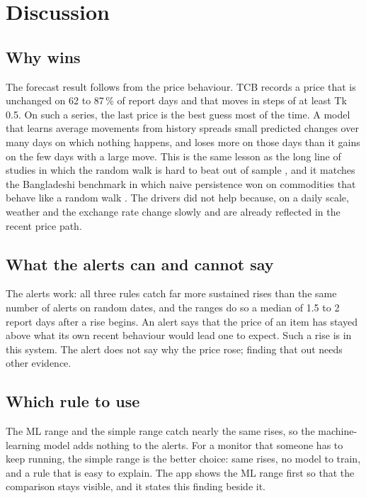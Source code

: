 \section{Discussion}

\subsection{Why \naive{} wins}
The forecast result follows from the price behaviour. TCB records a price that is unchanged on 62 to 87\,\% of report days and that moves in steps of at least Tk 0.5. On such a series, the last price is the best guess most of the time. A model that learns average movements from history spreads small predicted changes over many days on which nothing happens, and loses more on those days than it gains on the few days with a large move. This is the same lesson as the long line of studies in which the random walk is hard to beat out of sample \cite{meese1983}, and it matches the Bangladeshi benchmark in which naive persistence won on commodities that behave like a random walk \cite{agripricebd}. The drivers did not help because, on a daily scale, weather and the exchange rate change slowly and are already reflected in the recent price path.

\subsection{What the alerts can and cannot say}
The alerts work: all three rules catch far more sustained rises than the same number of alerts on random dates, and the ranges do so a median of 1.5 to 2 report days after a rise begins. An alert says that the price of an item has stayed above what its own recent behaviour would lead one to expect. Such a rise is \unexpl{} in this system. The alert does not say why the price rose; finding that out needs other evidence.

\subsection{Which rule to use}
The ML range and the simple range catch nearly the same rises, so the machine-learning model adds nothing to the alerts. For a monitor that someone has to keep running, the simple range is the better choice: same rises, no model to train, and a rule that is easy to explain. The app shows the ML range first so that the comparison stays visible, and it states this finding beside it.

